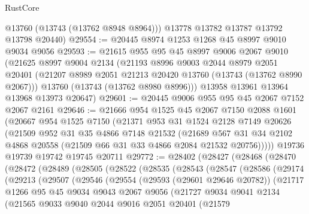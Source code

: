 \begin{lexlean}{RustCore}
\begin{coremodule}
        @13760
        (@13743 (@13762 @8948 @8964)))
      @13778
      @13782
      @13787
      @13792
      @13798
      @20440)
@29554 := @20445 @8974 @1253 @1268 @45 @8997 @9010 @9034 @9056
@29593 := @21615
    @955
    @95
    @45
    @8997
    @9006
    @2067
    @9010
    (@21625
      @8997
      @9004
      @2134
      (@21193
        @8996
        @9003
        @2044
        @8979
        @2051
        @20401
        (@21207 @8989 @2051 @21213 @20420 @13760 (@13743 (@13762 @8990 @2067)))
        @13760
        (@13743 (@13762 @8980 @8996)))
      @13958
      @13961
      @13964
      @13968
      @13973
      @20647)
@29601 := @20445 @9006 @955 @95 @45 @2067 @7152 @2067 @2161
@29646 := @21666
    @954
    @1525
    @45
    @2067
    @7150
    @2088
    @1601
    (@20667
      @954
      @1525
      @7150
      (@21371
        @953
        @31
        @1524
        @2128
        @7149
        @20626
        (@21509
          @952
          @31
          @35
          @4866
          @7148
          @21532
          (@21689 @567 @31 @34 @2102 @4868 @20558 (@21509 @66 @31 @33 @4866 @2084 @21532 @20756)))))
    @19736
    @19739
    @19742
    @19745
    @20711
@29772 := @28402
    (@28427
      (@28468
        (@28470
          (@28472
            (@28489
              (@28505
                (@28522
                  (@28535
                    (@28543
                      (@28547
                        (@28586
                          (@29174
                            (@29213
                              (@29507
                                (@29546
                                  (@29554
                                    (@29593 (@29601 @29646 @20782))
                                    (@21717
                                      @1266
                                      @95
                                      @45
                                      @9034
                                      @9043
                                      @2067
                                      @9056
                                      (@21727
                                        @9034
                                        @9041
                                        @2134
                                        (@21565
                                          @9033
                                          @9040
                                          @2044
                                          @9016
                                          @2051
                                          @20401
                                          (@21579

\end{coremodule}
\end{lexlean}

